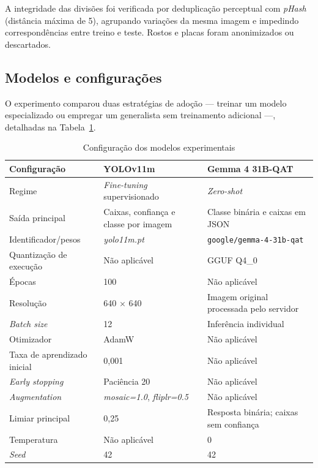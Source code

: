 \documentclass[kdmile,a4paper]{kdmile}
\begin{document}
A integridade das divisões foi verificada por deduplicação perceptual com \emph{pHash} (distância máxima de 5), agrupando variações da mesma imagem e impedindo correspondências entre treino e teste. Rostos e placas foram anonimizados ou descartados.

\subsection{Modelos e configurações}
\label{sec:modelos-configuracoes}

O experimento comparou duas estratégias de adoção --- treinar um modelo especializado ou empregar um generalista sem treinamento adicional ---, detalhadas na Tabela~\ref{tab:configuracao}.

\begin{table}[htbp]
\centering
\footnotesize
\caption{Configuração dos modelos experimentais}
\label{tab:configuracao}
\begin{tabular}{lp{4.2cm}p{5.2cm}}
\toprule
\textbf{Configuração} & \textbf{YOLOv11m} & \textbf{Gemma 4 31B-QAT} \\
\midrule
Regime & \emph{Fine-tuning} supervisionado & \emph{Zero-shot} \\
Saída principal & Caixas, confiança e classe por imagem & Classe binária e caixas em JSON \\
Identificador/pesos & \emph{yolo11m.pt} & \texttt{google/gemma-4-31b-qat} \\
Quantização de execução & Não aplicável & GGUF Q4\_0 \\
Épocas & 100 & Não aplicável \\
Resolução & 640 $\times$ 640 & Imagem original processada pelo servidor \\
\emph{Batch size} & 12 & Inferência individual \\
Otimizador & AdamW & Não aplicável \\
Taxa de aprendizado inicial & 0,001 & Não aplicável \\
\emph{Early stopping} & Paciência 20 & Não aplicável \\
\emph{Augmentation} & \emph{mosaic=1.0}, \emph{fliplr=0.5} & Não aplicável \\
Limiar principal & 0,25 & Resposta binária; caixas sem confiança \\
Temperatura & Não aplicável & 0 \\
\emph{Seed} & 42 & 42 \\
\bottomrule
\end{tabular}
\end{table}
\end{document}
